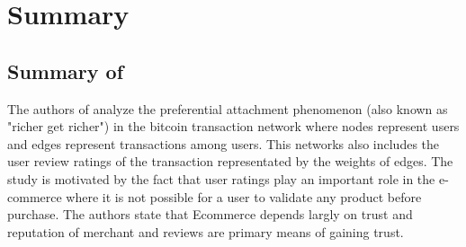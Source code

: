 
\section{Summary}\label{sec:summary}
\subsection{Summary of \cite{aw2018analyzing}}The authors of \cite{aw2018analyzing} analyze the preferential attachment phenomenon (also known as "richer get richer") in the bitcoin transaction network where nodes represent users and edges represent transactions among users. This networks also includes the user review ratings of the transaction representated by the weights of edges.  
The study is motivated by the fact that user ratings play an important role in the e-commerce where it is not possible for a user to validate any product before purchase. The authors state that Ecommerce depends largly on trust and reputation of merchant and reviews are primary means of gaining trust. 

